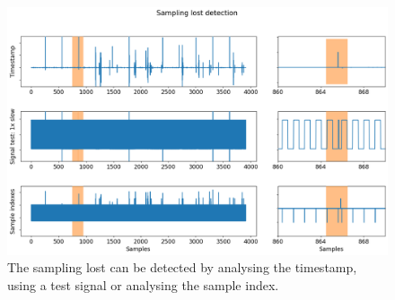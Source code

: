 
\begin{figure}
\begin{centering}
% 
\includegraphics[width=1\textwidth]{Cap3/Figures/sampling_lost_detection.png}
\par\end{centering}
\caption[Sampling lost detection]{The sampling lost can be detected by analysing the timestamp, using a test signal or analysing the sample index.}
\label{fig:sampling_lost_detection}
\end{figure}